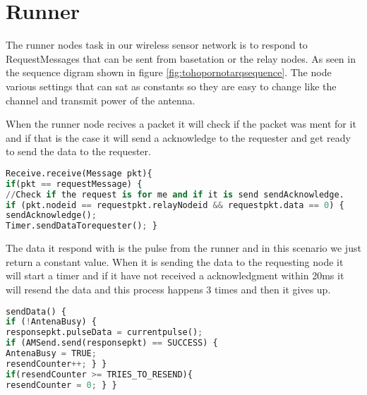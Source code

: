 \section{Runner}\label{sc:runner}
The runner nodes task in our wireless sensor network is to respond to RequestMessages that can be sent from basetation or the relay nodes. As seen in the sequence digram shown in figure \ref{fig:tohopornotarqsequence}. The node various settings that can sat as constants so they are easy to change like the channel and transmit power of the antenna.

When the runner node recives a packet it will check if the packet was ment for it and if that is the case it will send a acknowledge to the requester and get ready to send the data to the requester.
\begin{lstlisting}[language=Python]
Receive.receive(Message pkt){
if(pkt == requestMessage) {
//Check if the request is for me and if it is send sendAcknowledge.
if (pkt.nodeid == requestpkt.relayNodeid && requestpkt.data == 0) {
sendAcknowledge();
Timer.sendDataTorequester(); }
\end{lstlisting}
The data it respond with is the pulse from the runner and in this scenario we just return a constant value. When it is sending the data to the requesting node it will start a timer and if it have not received a acknowledgment within 20ms it will resend the data and this process happens 3 times and then it gives up.
\begin{lstlisting}[language=Python]
sendData() {
if (!AntenaBusy) {
responsepkt.pulseData = currentpulse();
if (AMSend.send(responsepkt) == SUCCESS) {
AntenaBusy = TRUE;
resendCounter++; } }		
if(resendCounter >= TRIES_TO_RESEND){
resendCounter = 0; } }
\end{lstlisting}

